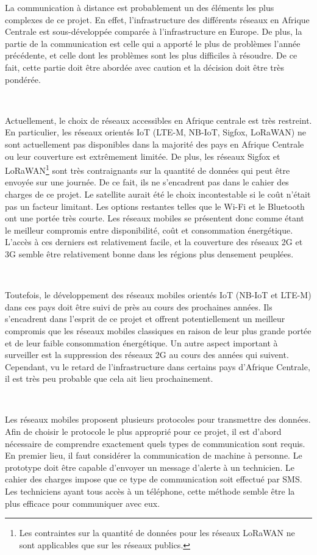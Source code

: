 La communication à distance est probablement un des éléments les plus complexes de ce projet. En effet, l'infrastructure des différents réseaux en Afrique Centrale est sous-développée comparée à l'infrastructure en Europe. De plus, la partie de la communication est celle qui a apporté le plus de problèmes l'année précédente, et celle dont les problèmes sont les plus difficiles à résoudre. De ce fait, cette partie doit être abordée avec caution et la décision doit être très pondérée.

~

\noindent
Actuellement, le choix de réseaux accessibles en Afrique centrale est très restreint. En particulier, les réseaux orientés IoT (LTE-M, NB-IoT, Sigfox, LoRaWAN) ne sont actuellement pas disponibles dans la majorité des pays en Afrique Centrale ou leur couverture est extrêmement limitée.
De plus, les réseaux Sigfox et LoRaWAN\footnote{Les contraintes sur la quantité de données pour les réseaux LoRaWAN ne sont applicables que sur les réseaux publics.} sont très contraignants sur la quantité de données qui peut être envoyée sur une journée. De ce fait, ils ne s'encadrent pas dans le cahier des charges de ce projet. Le satellite aurait été le choix incontestable si le coût n'était pas un facteur limitant. Les options restantes telles que le Wi-Fi et le Bluetooth ont une portée très courte.  Les réseaux mobiles se présentent donc comme étant le meilleur compromis entre disponibilité, coût et consommation énergétique. L'accès à ces derniers est relativement facile, et la couverture des réseaux 2G et 3G semble être relativement bonne dans les régions plus densement peuplées. \cite{coverage_airtel, coverage_orange}


~

\noindent
Toutefois, le développement des réseaux mobiles orientés IoT (NB-IoT et LTE-M) dans ces pays doit être suivi de près au cours des prochaines années. Ils s'encadrent dans l'esprit de ce projet et offrent potentiellement un meilleur compromis que les réseaux mobiles classiques en raison de leur plus grande portée et de leur faible consommation énergétique.  Un autre aspect important à surveiller est la suppression des réseaux 2G au cours des années qui suivent. Cependant, vu le retard de l'infrastructure dans certains pays d'Afrique Centrale, il est très peu probable que cela ait lieu prochainement.

~

\noindent
Les réseaux mobiles proposent plusieurs protocoles pour transmettre des données. Afin de choisir le protocole le plus approprié pour ce projet, il est d'abord nécessaire de comprendre exactement quels types de communication sont requis. En premier lieu, il faut considérer la communication de machine à personne. Le prototype doit être capable d'envoyer un message d'alerte à un technicien. Le cahier des charges impose que ce type de communication soit effectué par SMS. Les techniciens ayant tous accès à un téléphone, cette méthode semble être la plus efficace pour communiquer avec eux.

